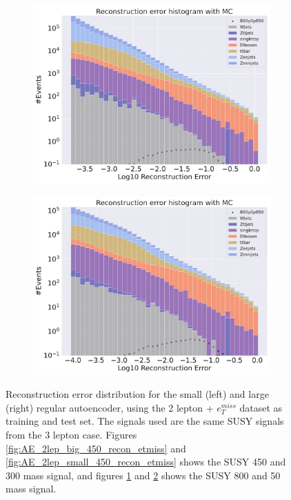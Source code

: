 \begin{figure}[H]
    \hfill
    \begin{subfigure}{.45\textwidth}
        \includegraphics[width=\textwidth]{Figures/AE_testing/big/2lep/b_data_recon_big_rm3_feats_sig_800p0p050_.pdf}
        \caption{}
        \label{fig:AE_2lep_big_800_recon_etmiss}
    \end{subfigure}
    \hfill   
    \begin{subfigure}{.45\textwidth}
        \includegraphics[width=\textwidth]{Figures/AE_testing/small/2lep/b_data_recon_big_rm3_feats_sig_800p0p050_.pdf}
        \caption{}
        \label{fig:AE_2lep_small_800_recon_etmiss}
    \end{subfigure}
    \hfill      
    \caption[2lep reconstruction error with SUSY signals for AE]{Reconstruction error distribution for the small (left) and large (right)
    regular autoencoder, using the 2 lepton + $e_T^{miss}$ dataset as training and test set. The signals used are the same SUSY signals 
    from the 3 lepton case. Figures \ref{fig:AE_2lep_big_450_recon_etmiss} and \ref{fig:AE_2lep_small_450_recon_etmiss} shows the SUSY 450 and 300 mass signal, 
    and figures \ref{fig:AE_2lep_big_800_recon_etmiss} and \ref{fig:AE_2lep_small_800_recon_etmiss} shows the SUSY 800 and 50 mass signal.}
    \label{fig:AE_2lep_recon_err_both_sig}
\end{figure}

